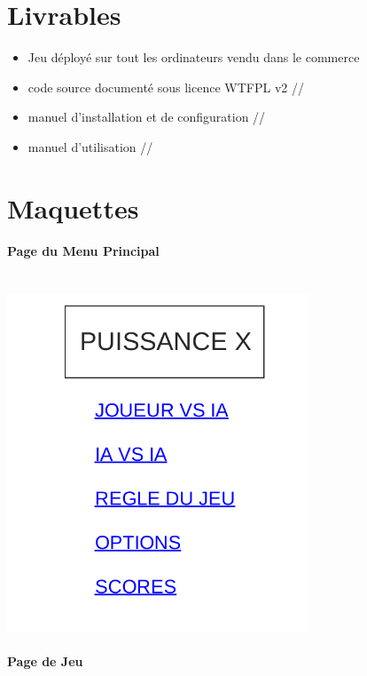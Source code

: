 \documentclass[a4paper,oneside]{article}
\begin{document}
\section{Livrables}

\begin{itemize}
    \item Jeu déployé sur tout les ordinateurs vendu dans le commerce
    \item code source documenté sous licence WTFPL v2 //
    \item manuel d'installation et de configuration //
    \item manuel d'utilisation //
\end{itemize}







\section{Maquettes}

\paragraph{Page du Menu Principal}

~\\

\includegraphics[width=9cm]{image2.png}

\paragraph{Page de Jeu}
\end{document}
